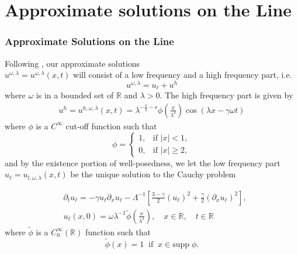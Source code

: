 \documentclass{beamer}
\newcommand{\rr}{\mathbb{R}}
\newcommand{\p}{\partial}
\begin{document}
\section{Approximate solutions on the Line}
\begin{frame}
	\frametitle{Approximate Solutions on the Line}
Following \cite{Himonas_2009_Non-uniform-dep}, our approximate solutions
\\ $u^{\omega, \lambda} = u^{\omega,
\lambda}(x,t)$ will
consist of a low frequency and a high frequency part,
i.e.
%
%
%
%
\begin{equation*}
\label{apple1}
u^{\omega,\lambda} = u_\ell + u^h
\end{equation*}
%
%
%
%
where $\omega$ is in a bounded set of $\rr$ and $\lambda > 0$. The high frequency part is given by 
\pause
%
%
%
%
\begin{equation*}
\begin{split}
u^h = u^{h,\omega,\lambda}(x,t) =
\lambda^{-\frac{\delta}{2} -s}
\phi \left (\frac{x}{\lambda^\delta}\right )
\cos(\lambda x - \gamma \omega t)
\end{split}
\end{equation*}
%
%
%
%
where $\phi$ is a $C^\infty$ cut-off function such that
%
%
%
%
\begin{equation*}
\phi = \begin{cases}
1, &\text{if $|x|<1$,} \\
0, &\text{if $|x| \ge 2,$} \end{cases}
\end{equation*}
%
%
%
%
\pause
and by the existence portion of well-posedness,
we let the low frequency part $u_\ell = u_{l,
\omega, \lambda}(x,t)$ be the unique solution to the Cauchy problem
\end{frame}
%
%
\begin{frame}
\begin{align*}
& \p_t u_\ell = -\gamma u_\ell \p_x u_\ell -
\Lambda^{-1} \left[ \frac{3-\gamma}{2}(u_\ell)^2 +
\frac{\gamma}{2} \left( \p_x u_\ell \right)^2
\right],
\\
& u_\ell(x,0) = \omega \lambda^{-1} \tilde{\phi} \left(
\frac{x}{\lambda^{\delta}}
\right), \quad x \in \rr, \quad t \in \rr
\end{align*}
%
%
%
%
where $\tilde{\phi}$ is a $C^{\infty}_0(\rr)$ function such that
%
%
%
%
\begin{equation*}
\label{apple1***}
\tilde{\phi}(x) = 1 \; \;  \text{if} \; \;
x \in \text{supp} \; \phi.
\end{equation*}
\end{frame}
%
%
\end{document}
